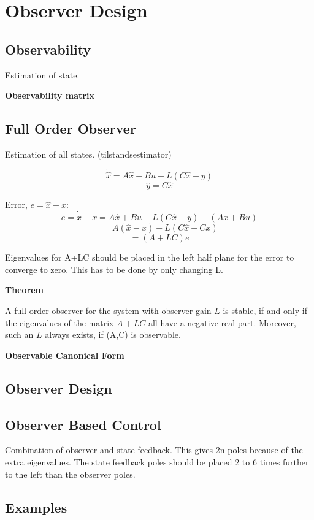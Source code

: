 \section{Observer Design}


\subsection{Observability}
Estimation of state.


\textbf{Observability matrix}

\subsection{Full Order Observer}
Estimation of all states. (tilstandsestimator)

$$\dot{\hat{x}} = A\hat{x} + Bu + L(C\hat{x}-y)$$
$$\hat{y} = C\hat{x}$$

Error, $e = \hat{x} - x$:
$$\dot{e} = \dot{\hat{x}} - \dot{x} = A\hat{x}+Bu+L(C\hat{x} - y) - (Ax+Bu) $$
$$ = A(\hat{x}-x) + L(C\hat{x}-Cx)$$
$$ = (A+LC)e$$

Eigenvalues for A+LC should be placed in the left half plane for the error to converge to zero.
This has to be done by only changing L.

\textbf{Theorem}

A full order observer for the system with observer gain $L$ is stable,
if and only if the eigenvalues of the matrix $A+LC$ all have a negative real part.
Moreover, such an $L$ always exists, if (A,C) is observable.


\textbf{Observable Canonical Form}

\subsection{Observer Design}
\subsection{Observer Based Control}

Combination of observer and state feedback.
This gives 2n poles because of the extra eigenvalues.
The state feedback poles should be placed 2 to 6 times further
to the left than the observer poles.



\subsection{Examples}
